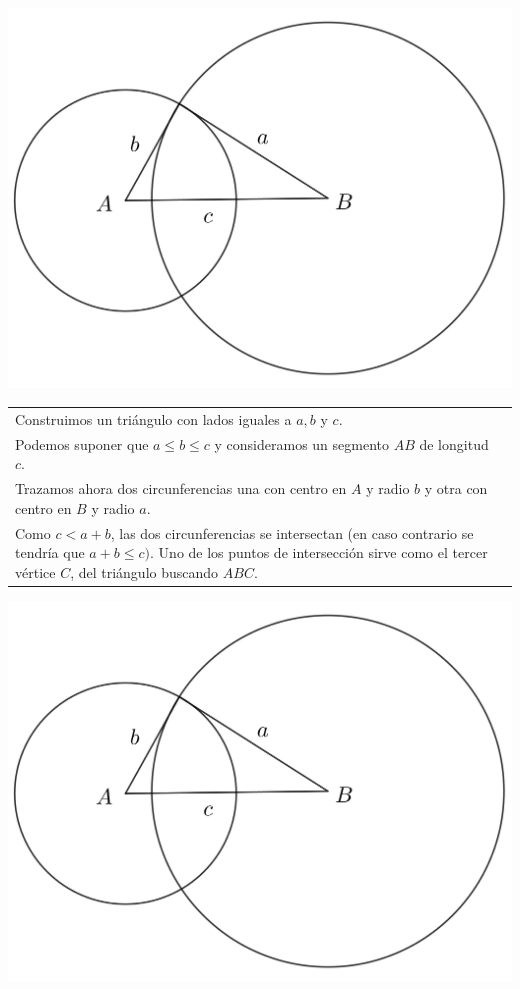 \documentclass[12pt,a4paper,oneside]{book}
\begin{document}
\begin{center}
\includegraphics[scale=0.45]{Imagenes/demo3.png} 
\end{center}
\begin{tabular}{p{15.9cm} p{1cm}}
\\Construimos un triángulo con lados iguales a $a, b$ y $c$. 
\\Podemos suponer que $a \leq b \leq c$ y consideramos un segmento $AB$ de longitud $c$.
\\Trazamos ahora dos circunferencias una con centro en $A$ y radio $b$ y otra con centro en $B$ y radio $a$.
\\Como $c<a+b$, las dos circunferencias se intersectan (en caso contrario se tendría que $a+b \leq c)$. Uno de los puntos de intersección sirve como el tercer vértice $C$, del triángulo buscando $ABC$.
\end{tabular}
\begin{center}
\includegraphics[scale=0.45]{Imagenes/demo3.png} 
\end{center}
\end{document}
